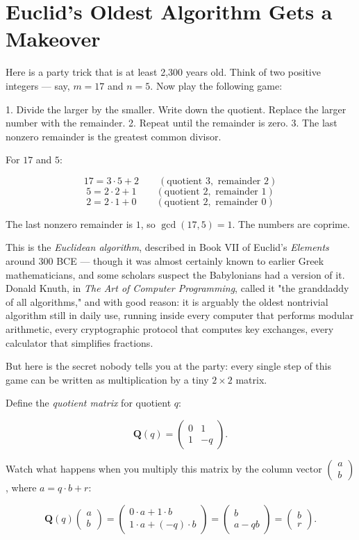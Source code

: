 \documentclass[12pt, letterpaper, openany]{book}
\theoremstyle{definition}
\theoremstyle{remark}
\begin{document}
\section*{Euclid's Oldest Algorithm Gets a Makeover}


Here is a party trick that is at least 2,300 years old. Think of two positive integers --- say, $m = 17$ and $n = 5$. Now play the following game:

1. Divide the larger by the smaller. Write down the quotient. Replace the larger number with the remainder.
2. Repeat until the remainder is zero.
3. The last nonzero remainder is the greatest common divisor.

For $17$ and $5$:

\[
17 = 3 \cdot 5 + 2 \qquad (\text{quotient } 3, \text{ remainder } 2)
\]
\[
5 = 2 \cdot 2 + 1 \qquad (\text{quotient } 2, \text{ remainder } 1)
\]
\[
2 = 2 \cdot 1 + 0 \qquad (\text{quotient } 2, \text{ remainder } 0)
\]

The last nonzero remainder is $1$, so $\gcd(17, 5) = 1$. The numbers are coprime.

This is the \textit{Euclidean algorithm}, described in Book VII of Euclid's \textit{Elements} around 300 BCE --- though it was almost certainly known to earlier Greek mathematicians, and some scholars suspect the Babylonians had a version of it. Donald Knuth, in \textit{The Art of Computer Programming}, called it "the granddaddy of all algorithms," and with good reason: it is arguably the oldest nontrivial algorithm still in daily use, running inside every computer that performs modular arithmetic, every cryptographic protocol that computes key exchanges, every calculator that simplifies fractions.

But here is the secret nobody tells you at the party: every single step of this game can be written as multiplication by a tiny $2 \times 2$ matrix.

Define the \textit{quotient matrix} for quotient $q$:

\[
\mathbf{Q}(q) = \begin{pmatrix} 0 & 1 \\ 1 & -q \end{pmatrix}.
\]

Watch what happens when you multiply this matrix by the column vector $\begin{pmatrix} a \\ b \end{pmatrix}$, where $a = q \cdot b + r$:

\[
\mathbf{Q}(q) \begin{pmatrix} a \\ b \end{pmatrix} = \begin{pmatrix} 0 \cdot a + 1 \cdot b \\ 1 \cdot a + (-q) \cdot b \end{pmatrix} = \begin{pmatrix} b \\ a - qb \end{pmatrix} = \begin{pmatrix} b \\ r \end{pmatrix}.
\]
\end{document}
